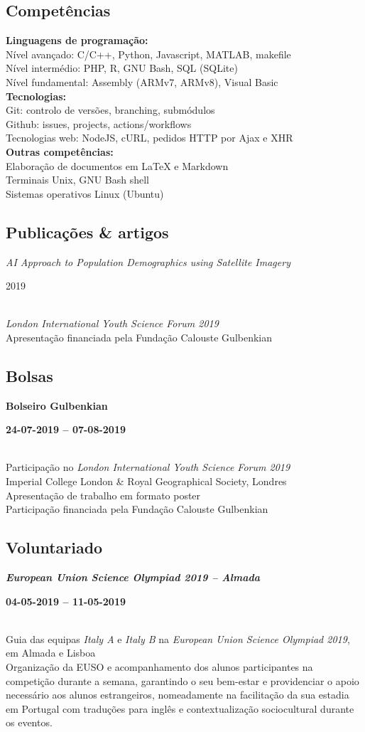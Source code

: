 \documentclass[8pt]{extarticle}
\newcommand{\parag}[1]{
\begin{minipage}{\textwidth} \hfill
\begin{minipage}{\dimexpr\textwidth-0.6cm}
	#1
\end{minipage}
\end{minipage}
}
\newcommand{\itemtime}[2]{
#1 \hfill \begin{minipage}[t]{0.185\textwidth}         #2  \end{minipage}
}
\newcommand{\job}[3]{\parag{
\itemtime{\textbf{#1}}{\textbf{#2}}\\
#3 \vspace*{9px}}}
\newcommand{\pub}[3]{\parag{
\itemtime{\textit{#1}}{#2}\\
#3 \vspace*{9px}}}
\begin{document}
\subsection*{Competências}
\parag{
\textbf{Linguagens de programação:}\\
Nível avançado: C/C++, Python, Javascript, MATLAB, makefile\\
Nível intermédio: PHP, R, GNU Bash, SQL (SQLite)\\
Nível fundamental: Assembly (ARMv7, ARMv8), Visual Basic\\ 
\textbf{Tecnologias:}\\
Git: controlo de versões, branching, submódulos\\
Github: issues, projects, actions/workflows\\
Tecnologias web: NodeJS, cURL, pedidos HTTP por Ajax e XHR\\
\textbf{Outras competências:}\\
Elaboração de documentos em LaTeX e Markdown\\
Terminais Unix, GNU Bash shell\\
Sistemas operativos Linux (Ubuntu)
}
\subsection*{Publicações \& artigos}
\pub{AI Approach to Population Demographics using Satellite Imagery}{2019}{
\textit{London International Youth Science Forum 2019}\\
Apresentação financiada pela Fundação Calouste Gulbenkian
}
\subsection*{Bolsas}
\job{Bolseiro Gulbenkian}{24-07-2019 – 07-08-2019}{
Participação no \textit{London International Youth Science Forum 2019}\\
Imperial College London \& Royal Geographical Society, Londres\\
Apresentação de trabalho em formato poster\\
Participação financiada pela Fundação Calouste Gulbenkian
}
\subsection*{Voluntariado}
\job{\textit{European Union Science Olympiad 2019 – Almada}}{04-05-2019 – 11-05-2019}{
Guia das equipas \textit{Italy A} e \textit{Italy B} na \textit{European Union Science Olympiad 2019}, em Almada e Lisboa\\
Organização da EUSO e acompanhamento dos alunos participantes na competição durante a semana, garantindo o seu bem-estar e providenciar o apoio necessário aos alunos estrangeiros, nomeadamente na facilitação da sua estadia em Portugal com traduções para inglês e contextualização sociocultural durante os eventos.
}
\end{document}
